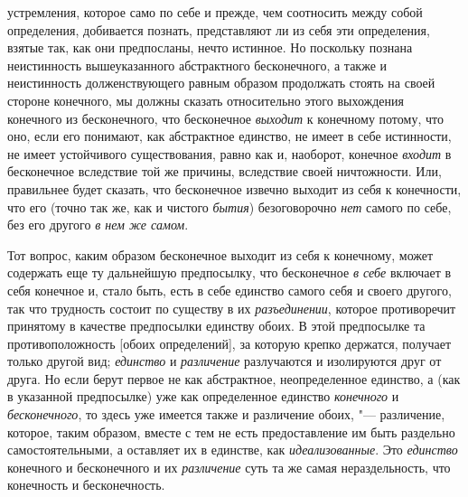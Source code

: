устремления, которое само по себе и прежде, чем соотносить между собой
определения, добивается познать, представляют ли из себя эти определения,
взятые так, как они предпосланы, нечто истинное. Но поскольку познана
неистинность вышеуказанного абстрактного бесконечного, а также и
неистинность долженствующего равным образом продолжать стоять на своей
стороне конечного, мы должны сказать относительно этого выхождения
конечного из бесконечного, что бесконечное
{\em выходит} к конечному потому, что оно, если его
понимают, как абстрактное единство, не имеет в себе истинности, не имеет
устойчивого существования, равно как и, наоборот, конечное
{\em входит} в бесконечное вследствие той же причины,
вследствие своей ничтожности. Или, правильнее будет сказать, что
бесконечное извечно выходит из себя к конечности, что его (точно так же,
как и чистого {\em бытия}) безоговорочно
{\em нет} самого по себе, без его другого {\em в нем же самом}.

Тот вопрос, каким образом бесконечное выходит из себя к конечному, может
содержать еще ту дальнейшую предпосылку, что бесконечное
{\em в себе} включает в себя конечное и, стало быть,
есть в себе единство самого себя и своего другого, так что трудность
состоит по существу в их {\em разъединении}, которое
противоречит принятому в качестве предпосылки единству обоих. В этой
предпосылке та противоположность [обоих определений], за которую крепко
держатся, получает только другой вид; {\em единство} и
{\em различение} разлучаются и изолируются друг от
друга. Но если берут первое не как абстрактное, неопределенное единство, а
(как в указанной предпосылке) уже как определенное единство
{\em конечного} и {\em бесконечного}, то здесь уже имеется также и
различение обоих, "--- различение, которое, таким образом, вместе с тем не
есть предоставление им быть раздельно самостоятельными, а оставляет их в
единстве, как {\em идеализованные}. Это {\em единство} конечного и
бесконечного и их {\em различение} суть та же самая нераздельность,
что конечность и бесконечность.


